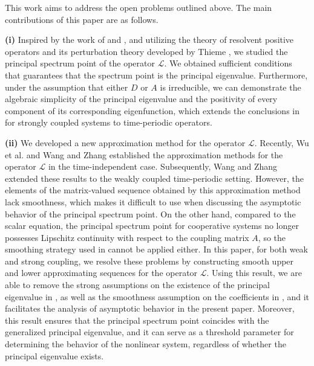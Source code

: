 \documentclass[11pt,reqno]{amsart}
\numberwithin{equation}{section}
\begin{document}
This work aims to address the open problems outlined above. The main contributions of this paper are as follows.

\textbf{(i)} Inspired by the work of \cite{Feng} and \cite{KR}, and utilizing the theory of resolvent positive operators and its perturbation theory developed by Thieme \cite{Th1,Th2}, we studied the principal spectrum point of the operator $\mathcal{L}$.
We obtained sufficient conditions that guarantees that the spectrum point is the principal eigenvalue. Furthermore, under the assumption that either $D$ or $A$ is irreducible, we can demonstrate the algebraic simplicity of the principal eigenvalue and the positivity of every component of its corresponding eigenfunction, which extends the conclusions in \cite{SWZ,SLLW} for strongly coupled systems to time-periodic operators.

\textbf{(ii)} We developed a new approximation method for the operator $\mathcal{L}$.
Recently, Wu et al. \cite{WFLS} and Wang and Zhang \cite{WZ} established the approximation methods for the operator $\mathcal{L}$ in the time-independent case. Subsequently, Wang and Zhang \cite{ZL1} extended these results to the weakly coupled time-periodic setting. However, the elements of the matrix-valued sequence obtained by this approximation method lack smoothness, which makes it difficult to use when discussing the asymptotic behavior of the principal spectrum point. On the other hand, compared to the scalar equation, the principal spectrum point for cooperative systems no longer possesses Lipschitz continuity with respect to the coupling matrix $A$, so the smoothing strategy used in \cite{WFLS} cannot be applied either.
In this paper, for both weak and strong coupling, we resolve these problems by constructing smooth upper and lower approximating sequences for the operator $\mathcal{L}$.
Using this result, we are able to remove the strong assumptions on the existence of the principal eigenvalue in \cite{NV2,Feng}, as well as the smoothness assumption on the coefficients in \cite{Feng}, and it facilitates the analysis of asymptotic behavior in the present paper.
Moreover, this result ensures that the principal spectrum point coincides with the generalized principal eigenvalue, and it can serve as a threshold parameter for determining the behavior of the nonlinear system, regardless of whether the principal eigenvalue exists.
\end{document}

